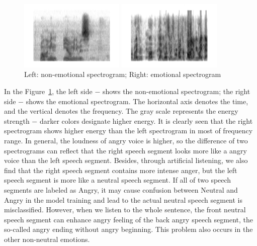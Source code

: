 \documentclass[a4paper]{article}
\begin{document}
\begin{figure}[htb]
\begin{minipage}[b]{.48\linewidth}
  \centering
  \centerline{\includegraphics[width=5.0cm]{neu}}
\end{minipage}
\hfill
\begin{minipage}[b]{0.48\linewidth}
  \centering
  \centerline{\includegraphics[width=5.0cm]{ang}}
\end{minipage}
%
\caption{Left: non-emotional spectrogram; Right: emotional spectrogram}
\label{fig:spectrogram}
\end{figure}

In the Figure~\ref{fig:spectrogram}, the left side $-$ shows the non-emotional spectrogram; the right side $-$ shows the emotional spectrogram. The horizontal axis denotes the time, and the vertical denotes the frequency. The gray scale represents the energy strength $-$ darker colors designate higher energy. It is clearly seen that the right spectrogram shows higher energy than the left spectrogram in most of frequency range. In general, the loudness of angry voice is higher, so the difference of two spectrograms can reflect that the right speech segment looks more like a angry voice than the left speech segment. Besides, through artificial listening, we also find that the right speech segment contains more intense anger, but the left speech segment is more like a neutral speech segment. If all of two speech segments are labeled as Angry, it may cause confusion between Neutral and Angry in the model training and lead to the actual neutral speech segment is misclassified. However, when we listen to the whole sentence, the front neutral speech segment can enhance angry feeling of the back angry speech segment, the so-called angry ending without angry beginning. This problem also occurs in the other non-neutral emotions. 
\end{document}
